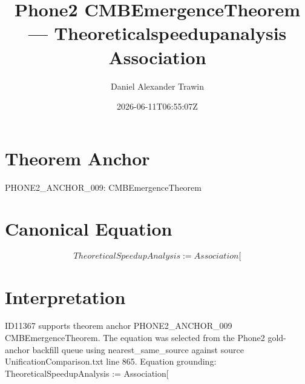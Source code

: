 \documentclass[11pt]{article}
\title{Phone2 CMBEmergenceTheorem — Theoreticalspeedupanalysis Association}
\author{Daniel Alexander Trawin}
\date{2026-06-11T06:55:07Z}
\begin{document}
\maketitle
\section*{Theorem Anchor}
PHONE2_ANCHOR_009: CMBEmergenceTheorem
\section*{Canonical Equation}
\[
TheoreticalSpeedupAnalysis := Association[
\]
\section*{Interpretation}
ID11367 supports theorem anchor PHONE2_ANCHOR_009 CMBEmergenceTheorem. The equation was selected from the Phone2 gold-anchor backfill queue using nearest_same_source against source UnificationComparison.txt line 865. Equation grounding: TheoreticalSpeedupAnalysis := Association[
\end{document}
